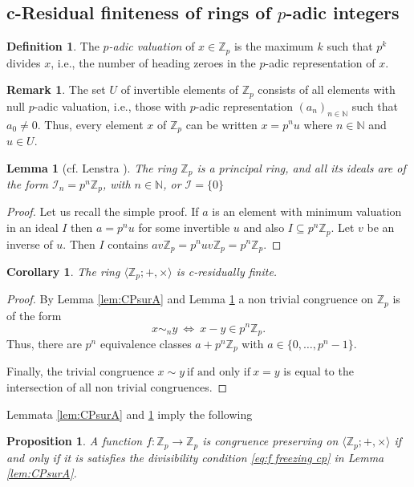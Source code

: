 \documentclass[11pt,a4paper]{article}
\newtheorem{proposition}[theorem]{Proposition}
\newtheorem{lemma}[theorem]{Lemma}
\newtheorem{corollary}[theorem]{Corollary}
\theoremstyle{definition} %
\newtheorem{definition}[theorem]{Definition}
\newtheorem{remark}[theorem]{Remark}
\newcommand\+[1]{\mathcal{#1}} %
\newcommand{\N}{{\mathbb N}}     %
\newcommand{\Z}{{\mathbb Z}}     %
\begin{document}
\subsection{c-Residual finiteness of rings of $p$-adic integers}
\label{ss residual finite in p-adic}
\begin{definition}
 The {\em $p$-adic valuation} of $x\in\Z_p$ is the maximum $k$ such that $p^k$ divides $x$,
i.e., the number of heading zeroes  in the $p$-adic representation of $x$.
\end{definition}
\begin{remark}
The set $U$ of invertible elements of $\Z_p$ consists of all elements with null $p$-adic valuation,
i.e., those with $p$-adic representation $(a_n)_{n\in\N}$ such that $a_0\neq0$.
Thus, every element $x$ of $\Z_p$ can be written 
$x=p^n u$ where $n\in\N$ and $u\in U$.
\end{remark}
%
%
\begin{lemma} [cf.\! Lenstra \cite{lenstra2}]\label{ZpPrincipal}  The ring
$\Z_p$ is a principal ring, and all its ideals  are of the form $\+I_n=p^n\Z_p$, with  $n\in\N$, or $\+I=\{0\}$
\end{lemma}

\begin{proof}
Let us recall the simple proof.
If $a$ is an element with minimum valuation in an ideal $I$ then $a=p^n u$ for some invertible $u$
and also $I\subseteq p^n\Z_p$.
Let $v$ be an inverse of $u$. Then $I$ contains $av\Z_p=p^nuv\Z_p=p^n\Z_p$.
\end{proof}
%
\begin{corollary}\label{congZp} The ring $\langle  \Z_p ;+,\times\rangle$ is 
c-residually finite.
\end{corollary}
\begin{proof}  By Lemma \ref{lem:CPsurA} and Lemma \ref{ZpPrincipal} a non trivial congruence on  $\Z_p$ is of the form
$$x\sim_n y\  \Longleftrightarrow\  x-y\in p^n\Z_p.$$
Thus, there are $p^n$ equivalence classes $a+ p^n\Z_p$ with $a\in \{0,\ldots,p^n-1\}$.

 Finally, the trivial congruence $x\sim y \ {\text {if and only if}}\  x=y$ is equal to the intersection of all non trivial congruences.
\end{proof}
%


%
Lemmata \ref{lem:CPsurA} and \ref{ZpPrincipal} imply the following
\begin{proposition} \label{th:CP-IDRsurZp} A function $f\colon \Z_p\rightarrow \Z_p$ is congruence preserving on $\langle  \Z_p ;+,\times\rangle$ if and only if it is satisfies the divisibility condition \eqref{eq:f freezing cp}  in Lemma \ref{lem:CPsurA}.
\end{proposition}
%
%
\end{document}
